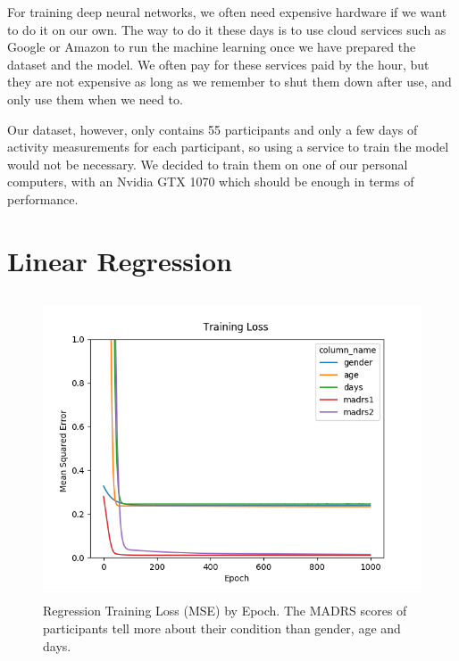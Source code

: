 For training deep neural networks, we often need expensive hardware if we want to do it on our own. The way to do it these days is to use cloud services such as Google or Amazon to run the machine learning once we have prepared the dataset and the model. We often pay for these services paid by the hour, but they are not expensive as long as we remember to shut them down after use, and only use them when we need to.

Our dataset, however, only contains 55 participants and only a few days of activity measurements for each participant, so using a service to train the model would not be necessary. We decided to train them on one of our personal computers, with an Nvidia GTX 1070 which should be enough in terms of performance.
 
\section{Linear Regression}

\begin{figure}
\begin{center}
      \includegraphics[height=9cm]{img/regression/results_kerasregressor_1k_epochs.png}
      \caption{Regression Training Loss (MSE) by Epoch. The MADRS scores of participants tell more about their condition than gender, age and days.}
      \label{figure:regression_training_loss}
\end{center}
\end{figure}

